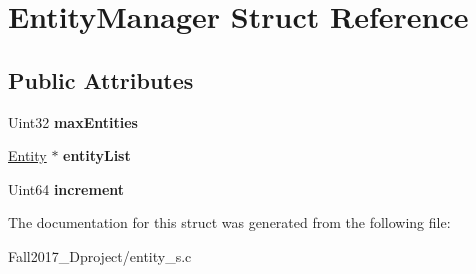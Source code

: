 \hypertarget{struct_entity_manager}{}\section{Entity\+Manager Struct Reference}
\label{struct_entity_manager}
\subsection*{Public Attributes}
\begin{DoxyCompactItemize}
\item 
\mbox{\label{struct_entity_manager_aebb8c464f507be58c6fa389baadf1153}} 
Uint32 {\bfseries max\+Entities}
\item 
\mbox{\label{struct_entity_manager_a83523f9c6c8e921bfac66f80f42940c5}} 
\hyperlink{structentity__s}{Entity} $\ast$ {\bfseries entity\+List}
\item 
\mbox{\label{struct_entity_manager_ab8ecf6ebdd29a9bd49ee2ecbda8a39aa}} 
Uint64 {\bfseries increment}
\end{DoxyCompactItemize}


The documentation for this struct was generated from the following file\+:\begin{DoxyCompactItemize}
\item 
Fall2017\+\_\+Dproject/entity\+\_\+s.\+c\end{DoxyCompactItemize}
